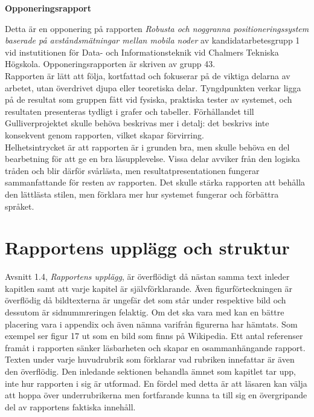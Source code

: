\documentclass[a4paper,11pt]{article}
\begin{document}
\begin{center}
{\noindent \LARGE {\bf Opponeringsrapport}}\\
\end{center}

Detta är en opponering på rapporten \emph{Robusta och noggranna positioneringssystem baserade på avståndsmätningar mellan mobila noder} av kandidatarbetesgrupp 1 vid instutitionen för Data- och Informationsteknik vid Chalmers Tekniska Högskola. Opponeringsrapporten är skriven av grupp 43. \\

Rapporten är lätt att följa, kortfattad och fokuserar på de viktiga delarna av arbetet, utan överdrivet djupa eller teoretiska delar. Tyngdpunkten verkar ligga på de resultat som gruppen fått vid fysiska, praktiska tester av systemet, och resultaten presenteras tydligt i grafer och tabeller. Förhållandet till Gulliverprojektet skulle behöva beskrivas mer i detalj: det beskrivs inte konsekvent genom rapporten, vilket skapar förvirring. \\

Helhetsintrycket är att rapporten är i grunden bra, men skulle behöva en del bearbetning för att ge en bra läsupplevelse. Vissa delar avviker från den logiska tråden och blir därför svårlästa, men resultatpresentationen fungerar sammanfattande för resten av rapporten. Det skulle stärka rapporten att behålla den lättlästa stilen, men förklara mer hur systemet fungerar och förbättra språket. \\

\section{Rapportens upplägg och struktur}
Avsnitt 1.4, \emph{Rapportens upplägg}, är överflödigt då nästan samma text inleder kapitlen samt att varje kapitel är självförklarande. Även figurförteckningen är överflödig då bildtexterna är ungefär det som står under respektive bild och dessutom är sidnummreringen felaktig. Om det ska vara med kan en bättre placering vara i appendix och även nämna varifrån figurerna har hämtats. Som exempel ser figur 17 ut som en bild som finns på Wikipedia. Ett antal referenser framåt i rapporten sänker läsbarheten och skapar en osammanhängande rapport. \\

Texten under varje huvudrubrik som förklarar vad rubriken innefattar är även den överflödig. Den inledande sektionen behandla ämnet som kapitlet tar upp, inte hur rapporten i sig är utformad. En fördel med detta är att läsaren kan välja att hoppa över underrubrikerna men fortfarande kunna ta till sig en övergripande del av rapportens faktiska innehåll. \\
\end{document}
